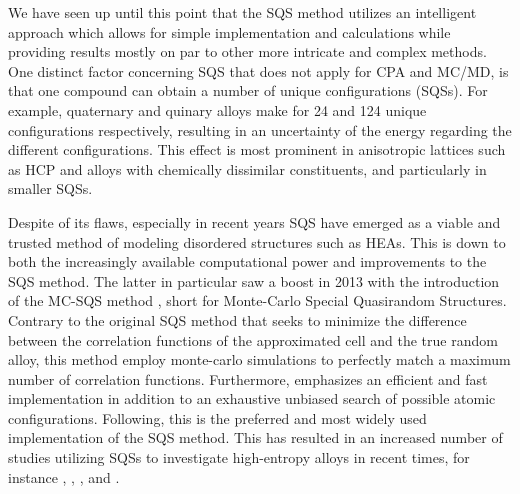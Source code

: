 We have seen up until this point that the SQS method utilizes an intelligent approach which allows for simple implementation and calculations while providing results mostly on par to other more intricate and complex methods. One distinct factor concerning SQS that does not apply for CPA and MC/MD, is that one compound can obtain a number of unique configurations (SQSs). For example, quaternary and quinary alloys make for 24 and 124 unique configurations respectively, resulting in an uncertainty of the energy regarding the different configurations. This effect is most prominent in anisotropic lattices such as HCP and alloys with chemically dissimilar constituents, and particularly in smaller SQSs. 
 
Despite of its flaws, especially in recent years SQS have emerged as a viable and trusted method of modeling disordered structures such as HEAs. This is down to both the increasingly available computational power and improvements to the SQS method. The latter in particular saw a boost in 2013 with the introduction of the MC-SQS method \cite{mcsqs2013}, short for Monte-Carlo Special Quasirandom Structures. Contrary to the original SQS method that seeks to minimize the difference between the correlation functions of the approximated cell and the true random alloy, this method employ monte-carlo simulations to perfectly match a maximum number of correlation functions. Furthermore, emphasizes an efficient and fast implementation in addition to an exhaustive unbiased search of possible atomic configurations. Following, this is the preferred and most widely used implementation of the SQS method. This has resulted in an increased number of studies utilizing SQSs to investigate high-entropy alloys in recent times, for instance \cite{WANG2021128754}, \cite{WEI2021167432}, \cite{RASHID2014285}, and \cite{SORKIN2021160776}.   






























































